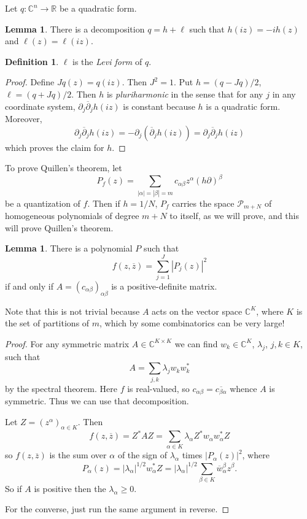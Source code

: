 \documentclass[12pt]{report}
\newcommand{\RR}{\mathbb{R}}
\newcommand{\CC}{\mathbb{C}}
\newcommand{\dbar}{\overline\partial}
\newcommand{\dfn}[1]{\emph{#1}\index{#1}}
\theoremstyle{definition}
\newtheorem{lemma}[theorem]{Lemma}
\newtheorem{definition}[theorem]{Definition}
\begin{document}
    Let $q: \CC^n \to \RR$ be a quadratic form.
\begin{lemma}
    There is a decomposition $q = h + \ell$ such that $h(iz) = -ih(z)$ and $\ell(z) = \ell(iz)$.
\end{lemma}
\begin{definition}
    $\ell$ is the \dfn{Levi form} of $q$.
\end{definition}
\begin{proof}
    Define $Jq(z) = q(iz)$. Then $J^2 = 1$. Put $h = (q - Jq)/2$, $\ell = (q + Jq)/2$. Then $h$ is \dfn{pluriharmonic} in the sense that for any $j$ in any coordinate system, $\partial_j \dbar_j h(iz)$ is constant because $h$ is a quadratic form. Moreover,
    $$\partial_j \dbar_j h(iz) = -\partial_j(\dbar_jh(iz)) = \partial_j \dbar_j h(iz)$$
    which proves the claim for $h$.
\end{proof}
    To prove Quillen's theorem, let
    $$P_f(z) = \sum_{|\alpha| = |\beta| = m} c_{\alpha\beta} z^\alpha (h\partial)^\beta$$
    be a quantization of $f$. Then if $h = 1/N$, $P_f$ carries the space $\mathcal P_{m + N}$ of homogeneous polynomials of degree $m + N$ to itself, as we will prove, and this will prove Quillen's theorem.
\begin{lemma}
    There is a polynomial $P$ such that
    $$f(z, \overline z) = \sum_{j=1}^J |P_j(z)|^2$$
    if and only if $A = (c_{\alpha\beta})_{\alpha\beta}$ is a positive-definite matrix.
\end{lemma}
    Note that this is not trivial because $A$ acts on the vector space $\CC^K$, where $K$ is the set of partitions of $m$, which by some combinatorics can be very large!
\begin{proof}
    For any symmetric matrix $A \in \CC^{K \times K}$ we can find $w_k \in \CC^K$, $\lambda_j$, $j,k \in K$, such that
    $$A = \sum_{j,k} \lambda_j w_k w_k^*$$
    by the spectral theorem. Here $f$ is real-valued, so $c_{\alpha\beta} = \overline{c_{\beta\alpha}}$ whence $A$ is symmetric. Thus we can use that decomposition.

    Let $Z = (z^\alpha)_{\alpha \in K}$. Then
    $$f(z, \overline z) = Z^*AZ = \sum_{\alpha \in K} \lambda_\alpha Z^*w_\alpha w_\alpha^* Z$$
    so $f(z, \overline z)$ is the sum over $\alpha$ of the sign of $\lambda_\alpha$ times $|P_\alpha(z)|^2$, where
    $$P_\alpha(z) = |\lambda_\alpha|^{1/2} w_\alpha^* Z = |\lambda_\alpha|^{1/2} \sum_{\beta \in K} \overline w_\alpha^\beta z^\beta.$$
    So if $A$ is positive then the $\lambda_\alpha \geq 0$.

    For the converse, just run the same argument in reverse.
\end{proof}
\end{document}
